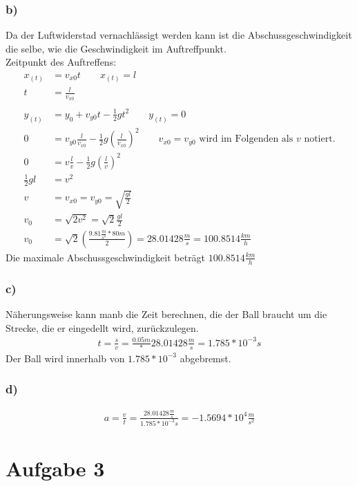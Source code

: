 \documentclass[a4paper,11pt]{article}
\begin{document}
  \subsubsection*{b)}
    Da der Luftwiderstad vernachlässigt werden kann ist die Abschussgeschwindigkeit die selbe, wie die Geschwindigkeit im Auftreffpunkt.\\
    Zeitpunkt des Auftreffens:
    \begin{align*}
      x_(t)&=v_{x0}t \qquad x_{(t)}=l \\
      t&=\frac{l}{v_{x0}}\\ \\
      y_{(t)}&=y_0+v_{y0}t-\frac{1}{2}gt^2 \qquad y_{(t)}=0 \\
      0&=v_{y0}\frac{l}{v_{x0}}-\frac{1}{2}g\left(\frac{l}{v_{x0}}\right)^2 \qquad v_{x0}=v_{y0}\mbox{ wird im Folgenden als $v$ notiert.}\\
      0&=v\frac{l}{v}-\frac{1}{2}g\left(\frac{l}{v}\right)^2 \\
      \frac{1}{2}gl&=v^2 \\
      v&=v_{x0}=v_{y0}=\sqrt{\frac{gl}{2}} \\
      v_0&=\sqrt{2v^2}=\sqrt{2}\frac{gl}{2} \\
      v_0&=\sqrt{2}\left(\frac{9.81\frac{m}{s^2}*80m}{2}\right)=28.01428\frac{m}{s}=100.8514\frac{km}{h}
    \end{align*}
    Die maximale Abschussgeschwindigkeit beträgt $100.8514\frac{km}{h}$
  \subsubsection*{c)} 
    Näherungsweise kann manb die Zeit berechnen, die der Ball braucht um die Strecke, die er eingedellt wird, zurückzulegen.
    \begin{align*}
      t=\frac{s}{v}=\frac{0.05m}*{28.01428\frac{m}{s}}=1.785*10^{-3}s
    \end{align*}
    Der Ball wird innerhalb von $1.785*10^{-3}$ abgebremst.
  \subsubsection*{d)}
    \begin{align*}
      a=\frac{v}{t}=\frac{28.01428\frac{m}{s}}{1.785*10^{-3}s}=-1.5694*10^{4}\frac{m}{s^2}
    \end{align*}
\section*{Aufgabe 3}
\end{document}
